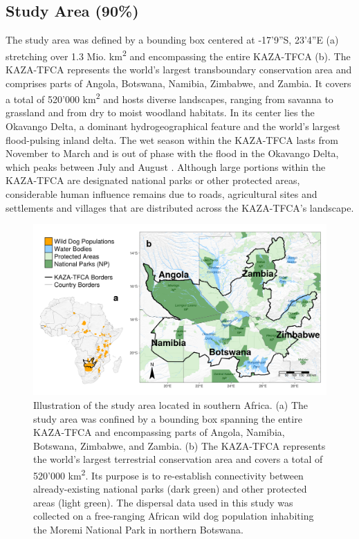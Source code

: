 \documentclass[abstract=on,10pt,a4paper,bibliography=totocnumbered]{article}
\begin{document}
\subsection{Study Area (90\%)}
The study area was defined by a bounding box centered at -17'9''S,
23'4''E (a) stretching over 1.3 Mio.
km\textsuperscript{2} and encompassing the entire KAZA-TFCA (b).
The KAZA-TFCA represents the world's largest transboundary conservation area and
comprises parts of Angola, Botswana, Namibia, Zimbabwe, and Zambia. It covers a
total of 520'000 km\textsuperscript{2} and hosts diverse landscapes, ranging
from savanna to grassland and from dry to moist woodland habitats. In its center
lies the Okavango Delta, a dominant hydrogeographical feature and the world's
largest flood-pulsing inland delta. The wet season within the KAZA-TFCA lasts
from November to March and is out of phase with the flood in the Okavango Delta,
which peaks between July and August \citep{McNutt.1996, Wolski.2017}. Although
large portions within the KAZA-TFCA are designated national parks or other
protected areas, considerable human influence remains due to roads, agricultural
sites and settlements and villages that are distributed across the KAZA-TFCA's
landscape.

\begin{figure}[htbp]
  \begin{center}
    \includegraphics[width = \textwidth]{99_StudyArea.png}
    \caption{Illustration of the study area located in southern Africa. (a) The
    study area was confined by a bounding box spanning the entire KAZA-TFCA and
    encompassing parts of Angola, Namibia, Botswana, Zimbabwe, and Zambia. (b)
    The KAZA-TFCA represents the world's largest terrestrial conservation area
    and covers a total of 520'000 km\textsuperscript{2}. Its purpose is to
    re-establish connectivity between already-existing national parks (dark
    green) and other protected areas (light green). The dispersal data used in
    this study was collected on a free-ranging African wild dog population
    inhabiting the Moremi National Park in northern Botswana.}
    \label{StudyArea}
  \end{center}
\end{figure}
\end{document}
